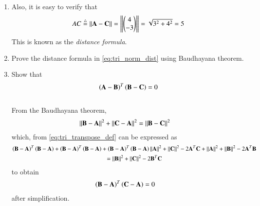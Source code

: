 \begin{enumerate}[label=\arabic*.,ref=\thesubsection.\theenumi]
\item Also, it is easy to verify that
%
\begin{align}
\label{eq:tri_norm_dist}
AC \stackrel{\triangle}{=}  \left\lVert\mathbf{A}-\mathbf{C}\right\rVert =  \left\lVert\begin{pmatrix}4\\-3\end{pmatrix}\right\rVert = \sqrt{3^2+4^2} = 5
\end{align}
%
This is known as the {\em distance formula}.
%
\item Prove the distance formula in \eqref{eq:tri_norm_dist} using Baudhayana theorem.
%
\item Show that 
\begin{align}
\label{eq:tri_baudh_orth}
\left(\mathbf{A}-\mathbf{B}\right)^T\left(\mathbf{B}-\mathbf{C}\right) = 0
\end{align}
\\
\solution From the Baudhayana theorem,
\begin{align}
\left\lVert\mathbf{B}-\mathbf{A}\right\rVert^2+\left\lVert\mathbf{C}-\mathbf{A}\right\rVert^2&=\left\lVert\mathbf{B}-\mathbf{C}\right\rVert^2
\end{align}
which, from \eqref{eq:tri_transpose_def}
 can be expressed as
\begin{multline}
\brak{\vec{B}-\vec{A}}^T\brak{\vec{B}-\vec{A}}
+
\brak{\vec{B}-\vec{A}}^T\brak{\vec{B}-\vec{A}}
+
\brak{\vec{B}-\vec{A}}^T\brak{\vec{B}-\vec{A}}
%
%
\norm{\vec{A}}^2 + \norm{\vec{C}}^2 - 2\vec{A}^T\vec{C}+
\norm{\vec{A}}^2 + \norm{\vec{B}}^2 - 2\vec{A}^T\vec{B}
\\
=
\norm{\vec{B}}^2 + \norm{\vec{C}}^2 - 2\vec{B}^T\vec{C}
\end{multline}
%
to obtain 
\begin{align}
\label{eq:tri_geo_ex_orth}
\left(\mathbf{B}-\mathbf{A}\right)^T\left(\mathbf{C}-\mathbf{A}\right)&=0
\end{align}
%
after simplification. 
\end{enumerate}
